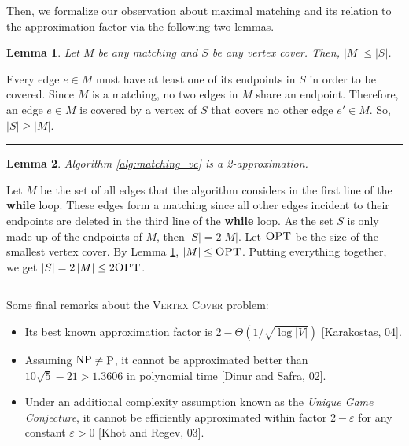 \documentclass[twoside]{article}
\newtheorem{lemma}{Lemma}
\def\P{\mathop{\rm P}\nolimits}
\def\NP{\mathop{\rm NP}\nolimits}
\newenvironment{proof}{{\bf Proof.}}{\hfill\rule{2mm}{2mm}}
\newcommand{\OPT}{\mbox{\sc OPT}}
\newcommand{\abs}[1]{\ensuremath{\left|#1\right|}}
\newcommand{\bigTheta}[1]{\ensuremath{\Theta\left(#1\right)}}
\begin{document}
Then, we formalize our observation about maximal matching and its relation to the approximation factor via the following two lemmas.

\begin{lemma}
\label{lem:matching}
Let $M$ be any matching and $S$ be any vertex cover. Then, $\abs{M} \leq \abs{S}$.
\end{lemma}
\begin{proof}
Every edge $e \in M$ must have at least one of its endpoints in $S$ in order to be covered. Since $M$ is a matching, no two edges in $M$ share an endpoint. Therefore, an edge $e \in M$ is covered by a vertex of $S$ that covers no other edge $e' \in M$. So, $\abs{S} \geq \abs{M}$.
\end{proof}

\begin{lemma}
Algorithm \ref{alg:matching_vc} is a 2-approximation.
\end{lemma}

\begin{proof}
Let $M$ be the set of all edges that the algorithm considers in the first line of the {\bf while} loop. These edges form a matching since all other edges incident to their endpoints are deleted in the third line of the {\bf while} loop. As the set $S$ is only made up of the endpoints of $M$, then $\abs{S} = 2\abs{M}$. Let $\OPT$ be the size of the smallest vertex cover. By Lemma \ref{lem:matching}, $\abs{M} \leq \OPT$. Putting everything together, we get $\abs{S} = 2 \abs{M} \leq 2 \OPT$. 
\end{proof}

Some final remarks about the \textsc{Vertex Cover} problem:
\begin{itemize}
    \item Its best known approximation factor is $2 - \bigTheta{1 / \sqrt{\log \abs{V}}}$ [Karakostas, 04].
    \item Assuming $\NP \neq \P$, it cannot be approximated better than $10 \sqrt{5} - 21 > 1.3606$ in polynomial time [Dinur and Safra, 02].
    \item Under an additional complexity assumption known as the \emph{Unique Game Conjecture}, it cannot be efficiently approximated within factor $2 - \varepsilon$ for any constant $\varepsilon > 0$ [Khot and Regev, 03].
\end{itemize}
\end{document}

